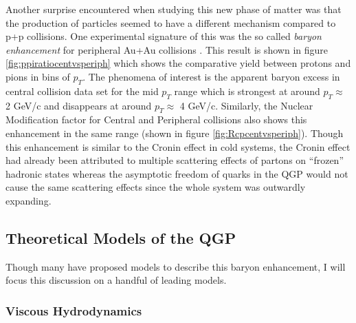 Another surprise encountered when studying this new phase of matter was that the production of particles seemed to have a different mechanism compared to p+p collisions. One experimental signature of this was the so called \textit{baryon enhancement} for peripheral Au+Au collisions \citep{PhysRevLett.97.152301}. This result is shown in figure \ref{fig:ppiratiocentvsperiph} which shows the comparative yield between protons and pions in bins of $p_{T}$. The phenomena of interest is the apparent baryon excess in central collision data set for the mid $p_{T}$ range which is strongest at around $p_{T}\approx$ 2 GeV/c and disappears at around $p_{T}\approx$ 4 GeV/c. Similarly, the Nuclear Modification factor for Central and Peripheral collisions also shows this enhancement in the same range (shown in figure \ref{fig:Rcpcentvsperiph}). Though this enhancement is similar to the Cronin effect in cold systems, the Cronin effect had already been attributed to multiple scattering effects of partons on ``frozen'' hadronic states whereas the asymptotic freedom of quarks in the QGP would not cause the same scattering effects since the whole system was outwardly expanding.

\subsection{Theoretical Models of the QGP}
Though many have proposed models to describe this baryon enhancement, I will focus this discussion on a handful of leading models.

\subsubsection{Viscous Hydrodynamics}

